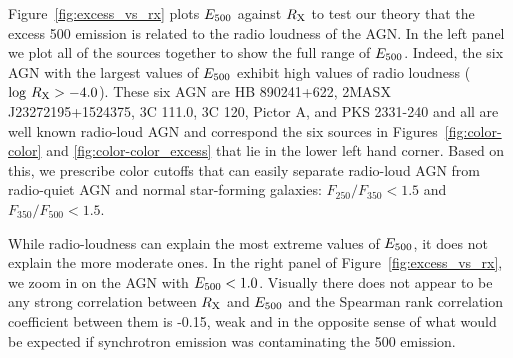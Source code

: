 Figure~\ref{fig:excess_vs_rx} plots $E_{\rm 500}$ against $R_{\rm X}$ to test our theory that the excess 500 \um{} emission is related to the radio loudness of the AGN. In the left panel we plot all of the sources together to show the full range of $E_{\rm 500}$. Indeed, the six AGN with the largest values of $E_{\rm 500}$ exhibit high values of radio loudness ($\log\,R_{\rm X} > -4.0$). These six AGN are HB 890241+622, 2MASX J23272195+1524375, 3C 111.0, 3C 120, Pictor A, and PKS 2331-240 and all are well known radio-loud AGN and correspond the six sources in Figures~\ref{fig:color-color} and \ref{fig:color-color_excess} that lie in the lower left hand corner. Based on this, we prescribe color cutoffs that can easily separate radio-loud AGN from radio-quiet AGN and normal star-forming galaxies: $F_{250}/F_{350} < 1.5$ and $F_{350}/F_{500} < 1.5$. 

While radio-loudness can explain the most extreme values of $E_{\rm 500}$, it does not explain the more moderate ones. In the right panel of Figure~\ref{fig:excess_vs_rx}, we zoom in on the AGN with $E_{\rm 500} < 1.0$. Visually there does not appear to be any strong correlation between $R_{\rm X}$ and $E_{\rm 500}$ and the Spearman rank correlation coefficient between them is -0.15, weak and in the opposite sense of what would be expected if synchrotron emission was contaminating the 500 \um{} emission.
  